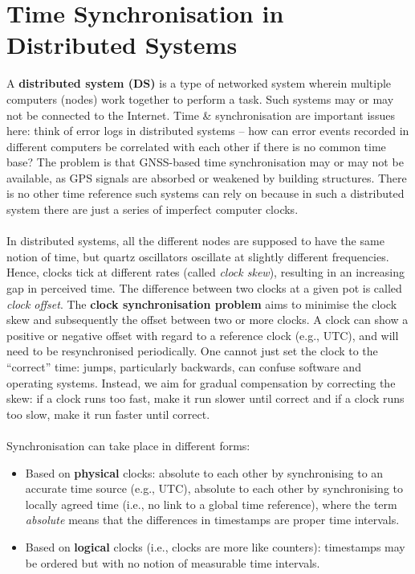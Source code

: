 \documentclass[a4paper,11pt]{article}
\begin{document}
\section{Time Synchronisation in Distributed Systems}
A \textbf{distributed system (DS)} is a type of networked system wherein multiple computers (nodes) work together to perform a task.
Such systems may or may not be connected to the Internet.
Time \& synchronisation are important issues here: think of error logs in distributed systems -- how can error events recorded in different computers be correlated with each other if there is no common time base?
The problem is that GNSS-based time synchronisation may or may not be available, as GPS signals are absorbed or weakened by building structures.
There is no other time reference such systems can rely on because in such a distributed system there are just a series of imperfect computer clocks.
\\\\
In distributed systems, all the different nodes are supposed to have the same notion of time, but quartz oscillators oscillate at slightly different frequencies.
Hence, clocks tick at different rates (called \textit{clock skew}), resulting in an increasing gap in perceived time.
The difference between two clocks at a given pot is called \textit{clock offset}.
The \textbf{clock synchronisation problem} aims to minimise the clock skew and subsequently the offset between two or more clocks.
A clock can show a positive or negative offset with regard to a reference clock (e.g., UTC), and will need to be resynchronised periodically.
One cannot just set the clock to the ``correct'' time: jumps, particularly backwards, can confuse software and operating systems.
Instead, we aim for gradual compensation by correcting the skew: if a clock runs too fast, make it run slower until correct and if a clock runs too slow, make it run faster until correct.
\\\\
Synchronisation can take place in different forms:
\begin{itemize}
    \item   Based on \textbf{physical} clocks: absolute to each other by synchronising to an accurate time source (e.g., UTC), absolute to each other by synchronising to locally agreed time (i.e., no link to a global time reference), where the term \textit{absolute} means that the differences in timestamps are proper time intervals.

    \item   Based on \textbf{logical} clocks (i.e., clocks are more like counters): timestamps may be ordered but with no notion of measurable time intervals.
\end{itemize}
\end{document}
